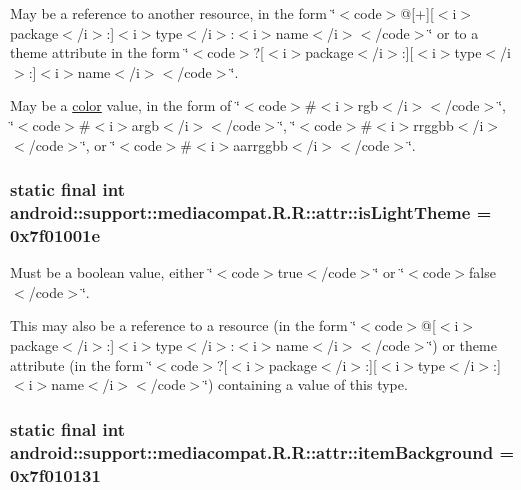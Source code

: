 May be a reference to another resource, in the form \char`\"{}$<$code$>$@\mbox{[}+\mbox{]}\mbox{[}$<$i$>$package$<$/i$>$:\mbox{]}$<$i$>$type$<$/i$>$:$<$i$>$name$<$/i$>$$<$/code$>$\char`\"{} or to a theme attribute in the form \char`\"{}$<$code$>$?\mbox{[}$<$i$>$package$<$/i$>$:\mbox{]}\mbox{[}$<$i$>$type$<$/i$>$:\mbox{]}$<$i$>$name$<$/i$>$$<$/code$>$\char`\"{}. 

May be a \hyperlink{classandroid_1_1support_1_1mediacompat_1_1_r_1_1color}{color} value, in the form of \char`\"{}$<$code$>$\#$<$i$>$rgb$<$/i$>$$<$/code$>$\char`\"{}, \char`\"{}$<$code$>$\#$<$i$>$argb$<$/i$>$$<$/code$>$\char`\"{}, \char`\"{}$<$code$>$\#$<$i$>$rrggbb$<$/i$>$$<$/code$>$\char`\"{}, or \char`\"{}$<$code$>$\#$<$i$>$aarrggbb$<$/i$>$$<$/code$>$\char`\"{}. \hypertarget{classandroid_1_1support_1_1mediacompat_1_1_r_1_1attr_d9c9d202035643e45300e1f27f6bd37d}{
\subsubsection[{isLightTheme}]{\setlength{\rightskip}{0pt plus 5cm}static final int android::support::mediacompat.R.R::attr::isLightTheme = 0x7f01001e}}
\label{classandroid_1_1support_1_1mediacompat_1_1_r_1_1attr_d9c9d202035643e45300e1f27f6bd37d}


Must be a boolean value, either \char`\"{}$<$code$>$true$<$/code$>$\char`\"{} or \char`\"{}$<$code$>$false$<$/code$>$\char`\"{}. 

This may also be a reference to a resource (in the form \char`\"{}$<$code$>$@\mbox{[}$<$i$>$package$<$/i$>$:\mbox{]}$<$i$>$type$<$/i$>$:$<$i$>$name$<$/i$>$$<$/code$>$\char`\"{}) or theme attribute (in the form \char`\"{}$<$code$>$?\mbox{[}$<$i$>$package$<$/i$>$:\mbox{]}\mbox{[}$<$i$>$type$<$/i$>$:\mbox{]}$<$i$>$name$<$/i$>$$<$/code$>$\char`\"{}) containing a value of this type. \hypertarget{classandroid_1_1support_1_1mediacompat_1_1_r_1_1attr_0480db04b2e9388e7d45db6f3601e202}{
\subsubsection[{itemBackground}]{\setlength{\rightskip}{0pt plus 5cm}static final int android::support::mediacompat.R.R::attr::itemBackground = 0x7f010131}}
\label{classandroid_1_1support_1_1mediacompat_1_1_r_1_1attr_0480db04b2e9388e7d45db6f3601e202}


